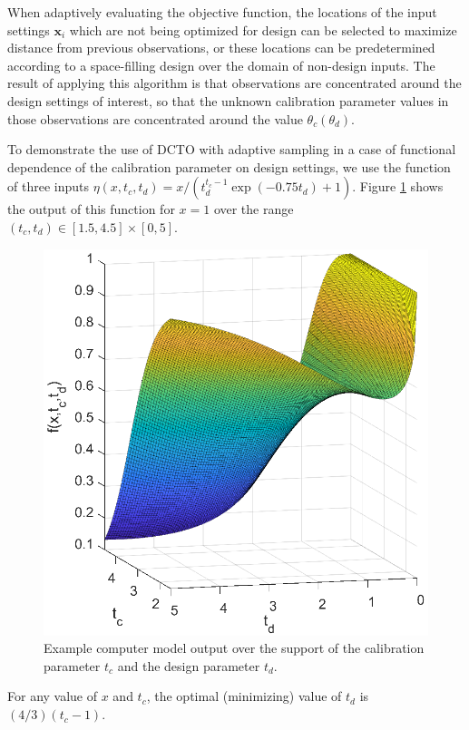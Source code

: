 \documentclass[12pt]{article}
\begin{document}
%
When adaptively evaluating the objective function, the locations of the input settings $\mathbf x_i$ which are not being optimized for design can be selected to maximize distance from previous observations, or these locations can be predetermined according to a space-filling design over the domain of non-design inputs.
%
The result of applying this algorithm is that observations are concentrated around the design settings of interest, so that the unknown calibration parameter values in those observations are concentrated around the value $\theta_c(\theta_d)$.
%

%
To demonstrate the use of DCTO with adaptive sampling in a case of functional dependence of the calibration parameter on design settings, we use the function of three inputs $\eta(x,t_c,t_d) = x / (t_d^{t_c-1}\exp(-0.75t_d)+1)$. 
%
Figure \ref{fig:example_output} shows the output of this function for $x=1$ over the range $(t_c,t_d)\in[1.5,4.5]\times[0,5]$.
%
\begin{figure}
	\centering
	\includegraphics[scale=0.85]{FIG_obj_fn.eps}
	\captionsetup{width=.85\linewidth}
	\caption{Example computer model output over the support of the calibration parameter $t_c$ and the design parameter $t_d$.}
	\label{fig:example_output}
\end{figure}
%
For any value of $x$ and $t_c$, the optimal (minimizing) value of $t_d$ is $(4/3)(t_c-1)$.
\end{document}
